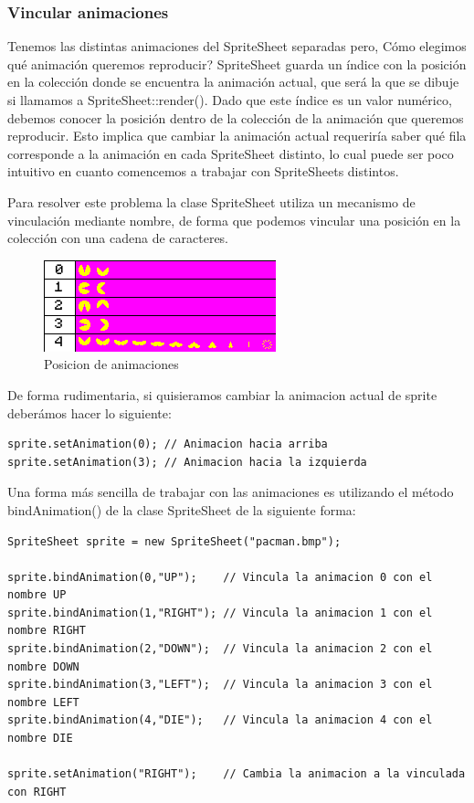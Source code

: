 \documentclass[parskip=half*]{scrartcl}
\begin{document}
		\subsubsection{Vincular animaciones}
			Tenemos las distintas animaciones del SpriteSheet separadas pero, \textquestiondown C\'omo elegimos qu\'e animaci\'on queremos reproducir? SpriteSheet guarda un \'indice con la posici\'on en la colecci\'on donde se encuentra la animaci\'on actual, que ser\'a la que se dibuje si llamamos a SpriteSheet::render(). Dado que este \'indice es un valor num\'erico, debemos conocer la posici\'on dentro de la colecci\'on de la animaci\'on que queremos reproducir. Esto implica que cambiar la animaci\'on actual requerir\'ia saber qu\'e fila corresponde a la animaci\'on en cada SpriteSheet distinto, lo cual puede ser poco intuitivo en cuanto comencemos a trabajar con SpriteSheets distintos.

			Para resolver este problema la clase SpriteSheet utiliza un mecanismo de vinculaci\'on mediante nombre, de forma que podemos vincular una posici\'on en la colecci\'on con una cadena de caracteres.

			\begin{figure}[h]
				\centering
				\includegraphics{animation.png}
				\caption{Posicion de animaciones}
			\end{figure}

			De forma rudimentaria, si quisieramos cambiar la animacion actual de sprite deber\'amos hacer lo siguiente:

			\begin{verbatim}
sprite.setAnimation(0);	// Animacion hacia arriba
sprite.setAnimation(3);	// Animacion hacia la izquierda
			\end{verbatim}

			Una forma m\'as sencilla de trabajar con las animaciones es utilizando el m\'etodo bindAnimation() de la clase SpriteSheet de la siguiente forma:

			\begin{verbatim}
SpriteSheet sprite = new SpriteSheet("pacman.bmp");

sprite.bindAnimation(0,"UP");    // Vincula la animacion 0 con el nombre UP
sprite.bindAnimation(1,"RIGHT"); // Vincula la animacion 1 con el nombre RIGHT
sprite.bindAnimation(2,"DOWN");  // Vincula la animacion 2 con el nombre DOWN
sprite.bindAnimation(3,"LEFT");  // Vincula la animacion 3 con el nombre LEFT
sprite.bindAnimation(4,"DIE");   // Vincula la animacion 4 con el nombre DIE

sprite.setAnimation("RIGHT");    // Cambia la animacion a la vinculada con RIGHT
			\end{verbatim}
\end{document}
